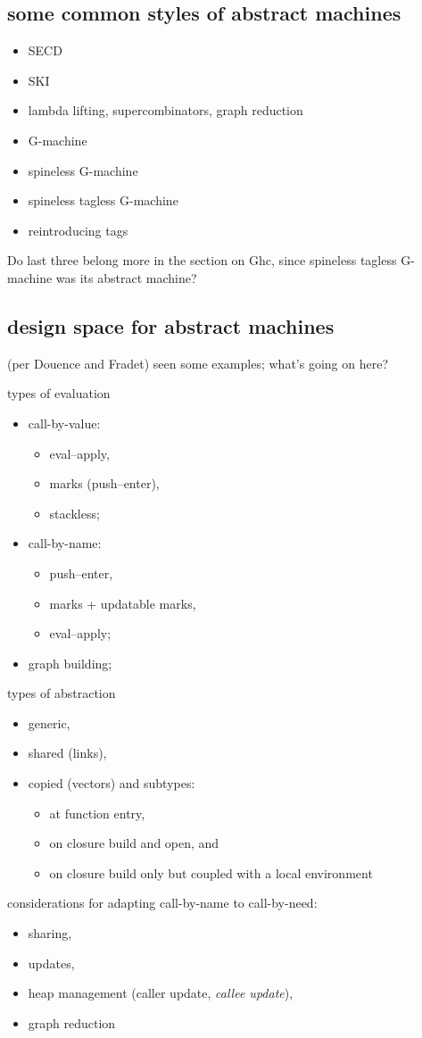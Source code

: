 \subsection{some common styles of abstract machines}
\begin{itemize}
\item SECD
\item SKI
\item lambda lifting, supercombinators, graph reduction
\item G-machine
\item spineless G-machine
\item spineless tagless G-machine
\item reintroducing tags
\end{itemize}
Do last three belong more in the section on Ghc, since spineless tagless G-machine was its abstract machine?

\subsection{design space for abstract machines}
(per Douence and Fradet) seen some examples; what's going on here?

types of evaluation
\begin{itemize}
\item call-by-value: 
\begin{itemize}
\item eval--apply, 
\item marks (push--enter), 
\item stackless;
\end{itemize}
\item call-by-name: 
\begin{itemize}
\item push--enter, 
\item marks + updatable marks, 
\item eval--apply;
\end{itemize} 
\item graph building;
\end{itemize}

types of abstraction
\begin{itemize}
\item generic, 
\item shared (links), 
\item copied (vectors) and subtypes: 
\begin{itemize}
\item at function entry, 
\item on closure build and open, and
\item on closure build only but coupled with a local environment
\end{itemize}
\end{itemize}
considerations for adapting call-by-name to call-by-need:
\begin{itemize}
\item sharing, 
\item updates, 
\item heap management (caller update, \emph{callee update}), 
\item graph reduction
\end{itemize}

